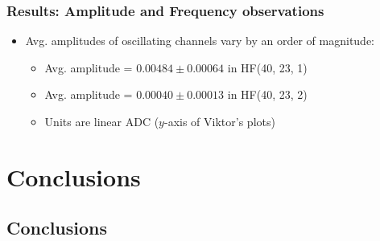 \documentclass[bigger]{beamer}
\begin{document}
\begin{frame}
\frametitle{Results: Amplitude and Frequency observations}
\label{sec-3-3-8}
\begin{itemize}

\item Avg. amplitudes of oscillating channels vary by an order of magnitude:
\label{sec-3-3-8-1}%
\begin{itemize}

\item Avg. amplitude = $0.00484 \pm 0.00064$ in HF(40, 23, 1)
\label{sec-3-3-8-1-1}%

\item Avg. amplitude = $0.00040 \pm 0.00013$ in HF(40, 23, 2)
\label{sec-3-3-8-1-2}%

\item Units are linear ADC ($y$-axis of Viktor's plots)
\label{sec-3-3-8-1-3}%
\end{itemize} %
\end{itemize} %
\end{frame}
\section{Conclusions}
\label{sec-4}
\subsection{Conclusions}
\label{sec-4-1}
\end{document}
